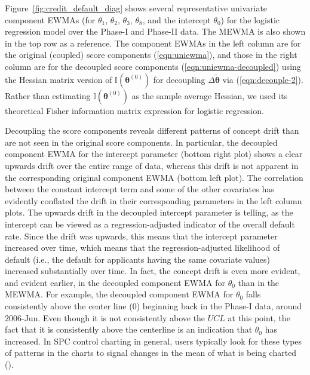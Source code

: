\documentclass[twoside,11pt]{article}
\begin{document}
Figure~\ref{fig:credit_default_diag} shows several representative univariate component EWMAs (for $\theta_1$, $\theta_2$, $\theta_3$, $\theta_8$, and the intercept $\theta_0$) for the logistic regression model over the Phase-I and Phase-II data. The MEWMA is also shown in the top row as a reference. The component EWMAs in the left column are for the original (coupled) score components (\ref{eqn:uniewma}), and those in the right column are for the decoupled score components (\ref{eqn:uniewma-decoupled}) using the Hessian matrix version of $\mathbb {I}(\bm { \theta}^{ (0)})$ for decoupling $\Delta \tilde{\bm { \theta}}$ via (\ref{eqn:decouple-2}). Rather than estimating $\mathbb {I}(\bm { \theta}^{ (0)})$ as the sample average Hessian, we used its theoretical Fisher information matrix expression for logistic regression. 

Decoupling the score components reveals different patterns of concept drift than are not seen in the original score components. In particular, the decoupled component EWMA for the intercept parameter (bottom right plot) shows a clear upwards drift over the entire range of data, whereas this drift is not apparent in the corresponding original component EWMA (bottom left plot). The correlation between the constant intercept term and some of the other covariates has evidently conflated the drift in their corresponding parameters in the left column plots. The upwards drift in the decoupled intercept parameter is telling, as the intercept can be viewed as a regression-adjusted indicator of the overall default rate. Since the drift was upwards, this means that the intercept parameter increased over time, which means that the regression-adjusted likelihood of default (i.e., the default for applicants having the same covariate values) increased substantially over time. In fact, the concept drift is even more evident, and evident earlier, in the decoupled component EWMA for $\theta_0$ than in the MEWMA. For example, the decoupled component EWMA for $\theta_0$ falls consistently above the center line ($0$) beginning back in the Phase-I data, around $2006$-Jun. Even though it is not consistently above the $UCL$  at this point, the fact that it is consistently above the centerline is an indication that $\theta_0$ has increased. In SPC control charting in general, users typically look for these types of patterns in the charts to signal changes in the mean of what is being charted (\cite{montgomery2007introduction}). 
\end{document}
